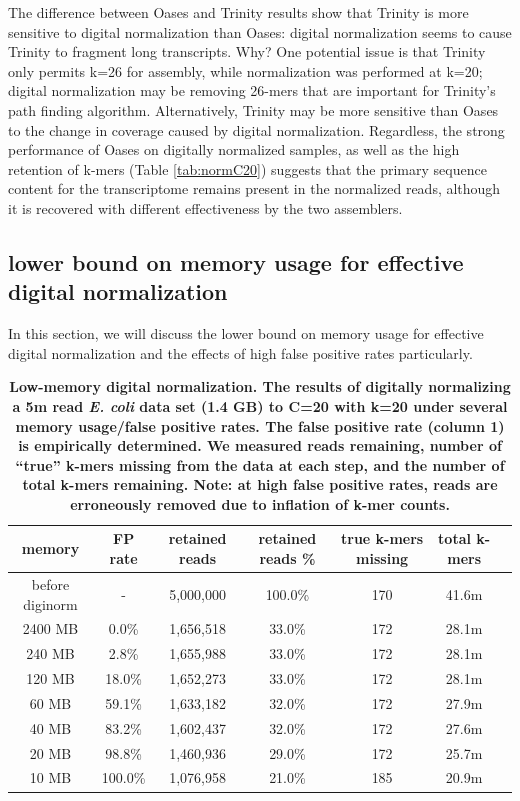 % 
The difference between Oases and Trinity results show that Trinity is more
sensitive to digital normalization than Oases: digital normalization seems to
cause Trinity to fragment long transcripts. Why?  One potential issue is that
Trinity only permits k=26 for assembly, while normalization was performed at
k=20; digital normalization may be removing 26-mers that are important for
Trinity's path finding algorithm.  Alternatively, Trinity may be more sensitive
than Oases to the change in coverage caused by digital normalization.
Regardless, the strong performance of Oases on digitally normalized samples, as
well as the high retention of k-mers (Table \ref{tab:normC20}) suggests that
the primary sequence content for the transcriptome remains present in the
normalized reads, although it is recovered with different effectiveness by the
two assemblers.


\subsection{lower bound on memory usage for effective digital normalization}

In this section, we will discuss the lower bound on memory usage for effective digital
normalization and the effects of high false positive rates particularly.

\begin{table}[!ht]
\caption{ \bf{Low-memory digital normalization. The results of
    digitally normalizing a 5m read {\em E. coli} data set (1.4 GB) to C=20
    with k=20 under several memory usage/false positive rates.  The
    false positive rate (column 1) is empirically determined.  We
    measured reads remaining, number of ``true'' k-mers missing from
    the data at each step, and the number of total k-mers remaining.
    Note: at high false positive rates, reads are erroneously removed due to
    inflation of k-mer counts.}}
\begin{tabular}{ | c | c | c | c | c | c | c |}
\hline
memory   & FP rate & retained reads & retained reads \% & true k-mers missing & total k-mers \\
\hline
before diginorm   &  -      & 5,000,000   & 100.0\%    & 170  &  41.6m \\
2400 MB           &   0.0\% & 1,656,518   &  33.0\%    & 172  &  28.1m \\
240 MB            &   2.8\% & 1,655,988   &  33.0\%    & 172  &  28.1m \\
120 MB            &  18.0\% & 1,652,273   &  33.0\%    & 172  &  28.1m \\
60 MB             &  59.1\% & 1,633,182   &  32.0\%    & 172  &  27.9m \\
40 MB             &  83.2\% & 1,602,437   &  32.0\%    & 172  &  27.6m \\
20 MB             &  98.8\% & 1,460,936   &  29.0\%    & 172  &  25.7m \\
10 MB             & 100.0\% & 1,076,958   &  21.0\%    & 185  &  20.9m \\
\end{tabular}
\begin{flushleft}
\end{flushleft}
\label{table:loop_norm}
\end{table}

